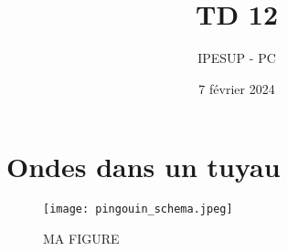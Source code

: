 \documentclass{article}
\title{TD 12 }
\author{IPESUP - PC }
\date{7 février 2024}
\begin{document}
\maketitle



\section{Ondes dans un tuyau}




\begin{figure}[h]
  \centering
  \texttt{[image: pingouin\_schema.jpeg]}
  \label{fig:maison}
    \caption{MA FIGURE}
\end{figure}
\end{document}

